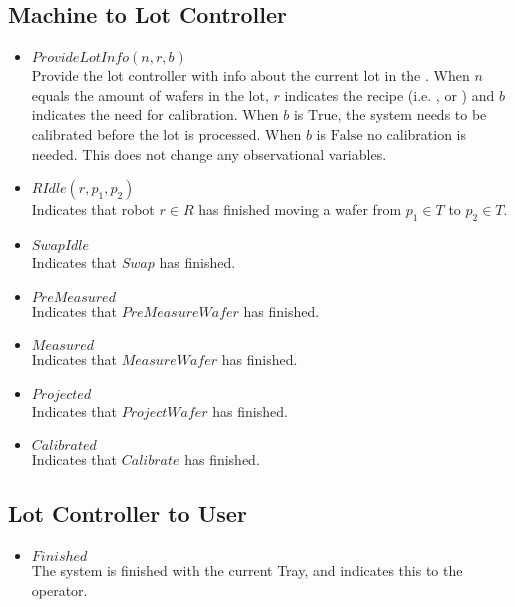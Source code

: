 \subsection{Machine to Lot Controller}
\begin{itemize}
    \item $\mathit{ProvideLotInfo}(n, r, b)$ \\
    Provide the lot controller with info about the current lot in the \tray.
    When $n$ equals the amount of wafers in the lot, $r$ indicates the recipe (i.e. \recipeOne, \recipeTwo or \recipeThree) and $b$ indicates the need for calibration.
    When $b$ is $\text{True}$, the system needs to be calibrated before the lot is processed.
    When $b$ is $\text{False}$ no calibration is needed.
    This does not change any observational variables.

    \item $\mathit{RIdle(r, p_1, p_2)}$ \\
    Indicates that robot $r \in R$ has finished moving a wafer from $p_1 \in T$ to $p_2 \in T$.
    
    \item $\mathit{SwapIdle}$ \\
    Indicates that $\mathit{Swap}$ has finished.

    \item $\mathit{PreMeasured}$ \\
    Indicates that $\mathit{PreMeasureWafer}$ has finished.

    \item $\mathit{Measured}$ \\
    Indicates that $\mathit{MeasureWafer}$ has finished.

    \item $\mathit{Projected}$ \\
    Indicates that $\mathit{ProjectWafer}$ has finished.

    \item $\mathit{Calibrated}$ \\
    Indicates that $\mathit{Calibrate}$ has finished.

\end{itemize}

\subsection{Lot Controller to User}
\begin{itemize}
    \item $\mathit{Finished}$ \\
    The system is finished with the current Tray, and indicates this to the operator.
\end{itemize}